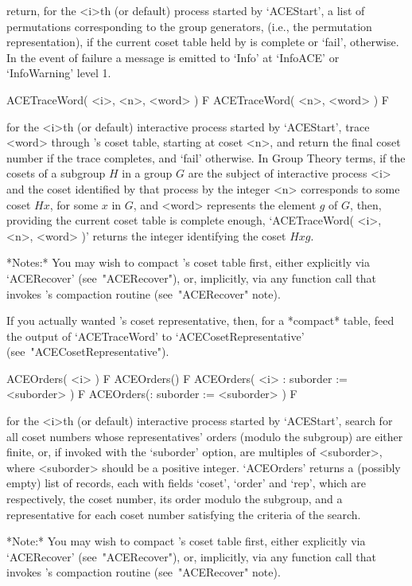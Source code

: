 return, for the <i>th (or default) process started  by  `ACEStart',  a
list of permutations corresponding to the group generators, (i.e., the
permutation representation), if the current coset table held by {\ACE}
is complete or `fail', otherwise. In the event of failure a message is
emitted to `Info' at `InfoACE' or `InfoWarning' level 1.

\>ACETraceWord( <i>, <n>, <word> ) F
\>ACETraceWord( <n>, <word> ) F

for the <i>th (or  default)  interactive  {\ACE}  process  started  by
`ACEStart', trace <word> through {\ACE}'s  coset  table,  starting  at
coset <n>, and return the final coset number if the  trace  completes,
and `fail' otherwise. In Group  Theory  terms,  if  the  cosets  of  a
subgroup $H$ in a group $G$ are  the  subject  of  interactive  {\ACE}
process <i> and the coset identified by that process  by  the  integer
<n> corresponds to some coset $Hx$, for some $x$ in  $G$,  and  <word>
represents the element $g$ of $G$, then, providing the  current  coset
table is complete enough, `ACETraceWord( <i>, <n>, <word>  )'  returns
the integer identifying the coset $Hxg$.

*Notes:*
You may wish to compact {\ACE}'s coset table first, either  explicitly
via `ACERecover' (see~"ACERecover"), or, implicitly, via any  function
call that invokes {\ACE}'s compaction routine (see~"ACERecover" note).

If you actually wanted {\ACE}'s  coset  representative,  then,  for  a
*compact*   table,   feed   the   output    of    `ACETraceWord'    to
`ACECosetRepresentative' (see~"ACECosetRepresentative").

\>ACEOrders( <i> ) F
\>ACEOrders() F
\>ACEOrders( <i> : suborder := <suborder> ) F
\>ACEOrders(: suborder := <suborder> ) F

for the <i>th (or  default)  interactive  {\ACE}  process  started  by
`ACEStart', search for all coset numbers whose representatives' orders
(modulo the subgroup) are either  finite,  or,  if  invoked  with  the
`suborder' option,  are  multiples  of  <suborder>,  where  <suborder>
should be a positive integer. `ACEOrders' returns a  (possibly  empty)
list of records, each with fields `coset', `order'  and  `rep',  which
are respectively, the coset number, its order modulo the subgroup, and
a representative for each coset number satisfying the criteria of  the
search.

*Note:*
You may wish to compact {\ACE}'s coset table first, either  explicitly
via `ACERecover' (see~"ACERecover"), or, implicitly, via any  function
call that invokes {\ACE}'s compaction routine (see~"ACERecover" note).

